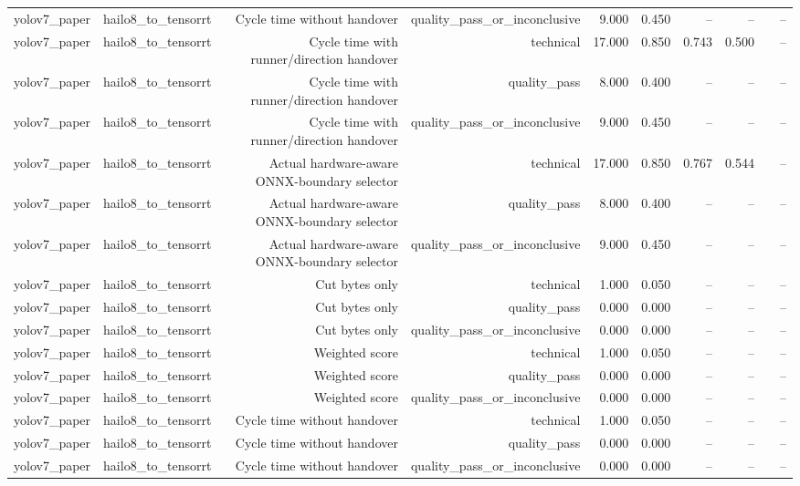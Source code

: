 \begin{table}[t]
\begin{tabular}{lrrrrrrrrr}
yolov7\_paper & hailo8\_to\_tensorrt & Cycle time without handover & quality\_pass\_or\_inconclusive & 9.000 & 0.450 & -- & -- &  & -- \\
yolov7\_paper & hailo8\_to\_tensorrt & Cycle time with runner/direction handover & technical & 17.000 & 0.850 & 0.743 & 0.500 &  & -- \\
yolov7\_paper & hailo8\_to\_tensorrt & Cycle time with runner/direction handover & quality\_pass & 8.000 & 0.400 & -- & -- &  & -- \\
yolov7\_paper & hailo8\_to\_tensorrt & Cycle time with runner/direction handover & quality\_pass\_or\_inconclusive & 9.000 & 0.450 & -- & -- &  & -- \\
yolov7\_paper & hailo8\_to\_tensorrt & Actual hardware-aware ONNX-boundary selector & technical & 17.000 & 0.850 & 0.767 & 0.544 &  & -- \\
yolov7\_paper & hailo8\_to\_tensorrt & Actual hardware-aware ONNX-boundary selector & quality\_pass & 8.000 & 0.400 & -- & -- &  & -- \\
yolov7\_paper & hailo8\_to\_tensorrt & Actual hardware-aware ONNX-boundary selector & quality\_pass\_or\_inconclusive & 9.000 & 0.450 & -- & -- &  & -- \\
yolov7\_paper & hailo8\_to\_tensorrt & Cut bytes only & technical & 1.000 & 0.050 & -- & -- &  & -- \\
yolov7\_paper & hailo8\_to\_tensorrt & Cut bytes only & quality\_pass & 0.000 & 0.000 & -- & -- &  & -- \\
yolov7\_paper & hailo8\_to\_tensorrt & Cut bytes only & quality\_pass\_or\_inconclusive & 0.000 & 0.000 & -- & -- &  & -- \\
yolov7\_paper & hailo8\_to\_tensorrt & Weighted score & technical & 1.000 & 0.050 & -- & -- &  & -- \\
yolov7\_paper & hailo8\_to\_tensorrt & Weighted score & quality\_pass & 0.000 & 0.000 & -- & -- &  & -- \\
yolov7\_paper & hailo8\_to\_tensorrt & Weighted score & quality\_pass\_or\_inconclusive & 0.000 & 0.000 & -- & -- &  & -- \\
yolov7\_paper & hailo8\_to\_tensorrt & Cycle time without handover & technical & 1.000 & 0.050 & -- & -- &  & -- \\
yolov7\_paper & hailo8\_to\_tensorrt & Cycle time without handover & quality\_pass & 0.000 & 0.000 & -- & -- &  & -- \\
yolov7\_paper & hailo8\_to\_tensorrt & Cycle time without handover & quality\_pass\_or\_inconclusive & 0.000 & 0.000 & -- & -- &  & -- \\

\end{tabular}
\end{table}
